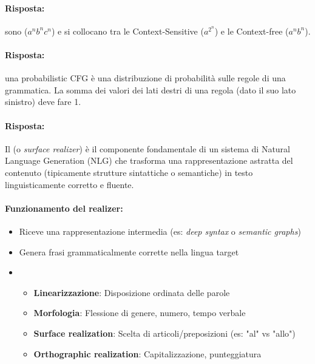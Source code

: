 \paragraph{Risposta:} sono  ($a^n b^n c^n$) e si collocano tra le Context-Sensitive ($a^{2^n}$) e le Context-free ($a^n b^n$).


\paragraph{Risposta:} una probabilistic CFG è una distribuzione di probabilità sulle regole di una grammatica. La somma dei valori dei lati destri di una regola (dato il suo lato sinistro) deve fare 1. 


\paragraph{Risposta:} Il  (o \textit{surface realizer}) è il componente fondamentale di un sistema di Natural Language Generation (NLG) che trasforma una rappresentazione astratta del contenuto (tipicamente strutture sintattiche o semantiche) in testo linguisticamente corretto e fluente. 

\paragraph{Funzionamento del realizer:}
\begin{itemize}
  \item {} Riceve una rappresentazione intermedia (es: \textit{deep syntax} o \textit{semantic graphs})
  \item {} Genera frasi grammaticalmente corrette nella lingua target
  \item {}
  \begin{itemize}
    \item \textbf{Linearizzazione}: Disposizione ordinata delle parole
    \item \textbf{Morfologia}: Flessione di genere, numero, tempo verbale
    \item \textbf{Surface realization}: Scelta di articoli/preposizioni (es: "al" vs "allo")
    \item \textbf{Orthographic realization}: Capitalizzazione, punteggiatura
  \end{itemize}
\end{itemize}

